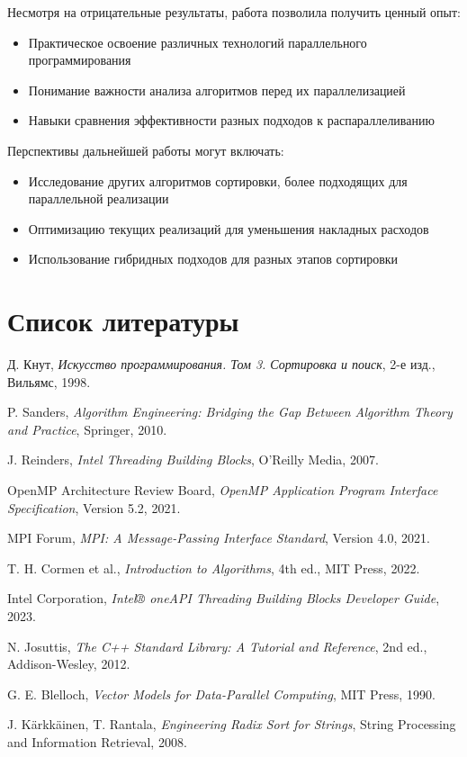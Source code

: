 \documentclass[a4paper,12pt]{article}
\begin{document}
Несмотря на отрицательные результаты, работа позволила получить ценный опыт:
\begin{itemize}
    \item Практическое освоение различных технологий параллельного программирования
    \item Понимание важности анализа алгоритмов перед их параллелизацией
    \item Навыки сравнения эффективности разных подходов к распараллеливанию
\end{itemize}

Перспективы дальнейшей работы могут включать:
\begin{itemize}
    \item Исследование других алгоритмов сортировки, более подходящих для параллельной реализации
    \item Оптимизацию текущих реализаций для уменьшения накладных расходов
    \item Использование гибридных подходов для разных этапов сортировки
\end{itemize}
\newpage

\section{Список литературы}
\begin{thebibliography}{9}
  Д. Кнут, \emph{Искусство программирования. Том 3. Сортировка и поиск}, 2-е изд., Вильямс, 1998.

  P. Sanders, \emph{Algorithm Engineering: Bridging the Gap Between Algorithm Theory and Practice}, Springer, 2010.

  J. Reinders, \emph{Intel Threading Building Blocks}, O'Reilly Media, 2007.

  OpenMP Architecture Review Board, \emph{OpenMP Application Program Interface Specification}, Version 5.2, 2021.

  MPI Forum, \emph{MPI: A Message-Passing Interface Standard}, Version 4.0, 2021.

  T. H. Cormen et al., \emph{Introduction to Algorithms}, 4th ed., MIT Press, 2022.

  Intel Corporation, \emph{Intel® oneAPI Threading Building Blocks Developer Guide}, 2023.

  N. Josuttis, \emph{The C++ Standard Library: A Tutorial and Reference}, 2nd ed., Addison-Wesley, 2012.

  G. E. Blelloch, \emph{Vector Models for Data-Parallel Computing}, MIT Press, 1990.

  J. Kärkkäinen, T. Rantala, \emph{Engineering Radix Sort for Strings}, String Processing and Information Retrieval, 2008.
\end{thebibliography}
\newpage
\end{document}
